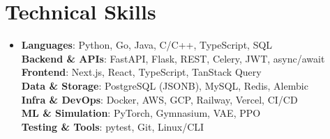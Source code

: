 \documentclass[letterpaper,11pt]{article}
\begin{document}
\section{Technical Skills}
\begin{itemize}[leftmargin=0.15in, label={}]
  \small\item{
    \textbf{Languages}{:  Python, Go, Java, C/C++, TypeScript, SQL} \\
    \textbf{Backend \& APIs}{:  FastAPI, Flask, REST, Celery, JWT, async/await} \\
    \textbf{Frontend}{:  Next.js, React, TypeScript, TanStack Query} \\
    \textbf{Data \& Storage}{:  PostgreSQL (JSONB), MySQL, Redis, Alembic} \\
    \textbf{Infra \& DevOps}{:  Docker, AWS, GCP, Railway, Vercel, CI/CD} \\
    \textbf{ML \& Simulation}{:  PyTorch, Gymnasium, VAE, PPO} \\
    \textbf{Testing \& Tools}{:  pytest, Git, Linux/CLI}
  }
\end{itemize}
\end{document}
